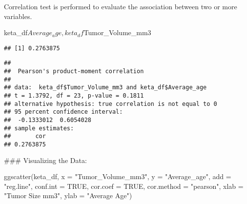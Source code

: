 \documentclass[
]{article}
\newenvironment{Shaded}{\begin{snugshade}}{\end{snugshade}}
\newcommand{\AttributeTok}[1]{\textcolor[rgb]{0.77,0.63,0.00}{#1}}
\newcommand{\ConstantTok}[1]{\textcolor[rgb]{0.00,0.00,0.00}{#1}}
\newcommand{\FunctionTok}[1]{\textcolor[rgb]{0.00,0.00,0.00}{#1}}
\newcommand{\NormalTok}[1]{#1}
\newcommand{\SpecialCharTok}[1]{\textcolor[rgb]{0.00,0.00,0.00}{#1}}
\newcommand{\StringTok}[1]{\textcolor[rgb]{0.31,0.60,0.02}{#1}}
\begin{document}
Correlation test is performed to evaluate the association between two or
more variables.

keta\_df\(Average_age, keta_df\)Tumor\_Volume\_mm3

\begin{Shaded}
\end{Shaded}

\begin{verbatim}
## [1] 0.2763875
\end{verbatim}

\begin{Shaded}
\end{Shaded}

\begin{verbatim}
## 
##  Pearson's product-moment correlation
## 
## data:  keta_df$Tumor_Volume_mm3 and keta_df$Average_age
## t = 1.3792, df = 23, p-value = 0.1811
## alternative hypothesis: true correlation is not equal to 0
## 95 percent confidence interval:
##  -0.1333012  0.6054028
## sample estimates:
##       cor 
## 0.2763875
\end{verbatim}

\#\#\# Visualizing the Data:

\begin{Shaded}
\begin{Highlighting}[]
\FunctionTok{ggscatter}\NormalTok{(keta\_df, }\AttributeTok{x =} \StringTok{"Tumor\_Volume\_mm3"}\NormalTok{, }\AttributeTok{y =} \StringTok{"Average\_age"}\NormalTok{, }
          \AttributeTok{add =} \StringTok{"reg.line"}\NormalTok{, }\AttributeTok{conf.int =} \ConstantTok{TRUE}\NormalTok{, }
          \AttributeTok{cor.coef =} \ConstantTok{TRUE}\NormalTok{, }\AttributeTok{cor.method =} \StringTok{"pearson"}\NormalTok{,}
          \AttributeTok{xlab =} \StringTok{"Tumor Size mm3"}\NormalTok{, }\AttributeTok{ylab =} \StringTok{"Average Age"}\NormalTok{)}
\end{Highlighting}
\end{Shaded}
\end{document}
